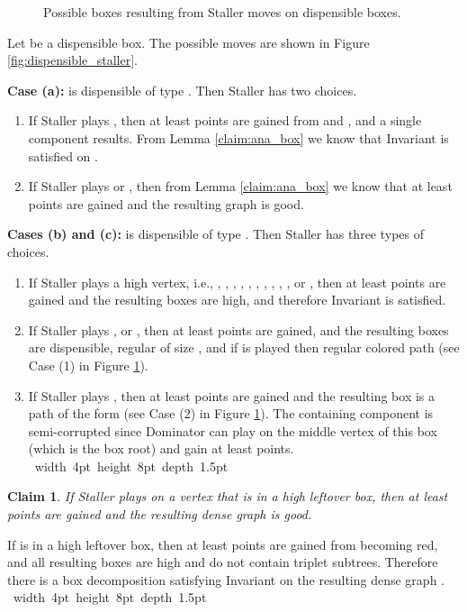 \documentclass[11pt]{article}
\def\Proof{\par\noindent{\bf Proof:~}}
\def\blackslug{\hbox{\hskip 1pt \vrule width 4pt height 8pt
    depth 1.5pt \hskip 1pt}}
\def\QED{\quad\blackslug\lower 8.5pt\null\par}
\def\dnsitem{\vspace{-7pt}\item}
\newtheorem{claim}[theorem]{Claim}
\theoremstyle{definition}
\begin{document}
\begin{figure}[hbtp]
  \caption{\sf Possible boxes resulting from Staller moves on dispensible boxes.}
  \medskip
  \centering
  \label{fig:dispensible_staller_sc}
\end{figure}
\Proof

Let  be a dispensible box.
The possible moves are shown in Figure \ref{fig:dispensible_staller}.

\smallskip
\par\noindent
{\bf Case (a):}
 is dispensible of type .
Then Staller has two choices.
\begin{enumerate}
	\dnsitem If Staller plays , then at least  points are gained from  and , and a single  component results. From Lemma \ref{claim:ana_box} we know that Invariant  is satisfied on . 
	\dnsitem If Staller plays  or , then from Lemma \ref{claim:ana_box} we know that at least  points are gained and the resulting graph  is good.
\end{enumerate}

\smallskip
\par\noindent
{\bf Cases (b) and (c):}
 is dispensible of type .
Then Staller has three types of choices.
\begin{enumerate}
	\dnsitem If Staller plays a high vertex, i.e., , , , , , , , , , ,  or ,
	then at least  points are gained and the resulting boxes are high, and therefore Invariant  is satisfied.
	\dnsitem If Staller plays ,  or , then at least  points are gained, and the resulting boxes are dispensible, regular of size , and if  is played then regular colored path (see Case (1) in Figure \ref{fig:dispensible_staller_sc}).
	\dnsitem If Staller plays , then at least  points are gained and the resulting box is a path of the form  (see Case (2) in Figure \ref{fig:dispensible_staller_sc}). The containing component is semi-corrupted since Dominator can play on the middle  vertex of this box (which is the box root) and gain at least  points. 
\QED
\end{enumerate}

\begin{claim}
\label{claim:staller_clean_leftover}
If Staller plays on  a vertex  that is in a high leftover box, then at least  points are gained and the resulting dense graph  is good.
\end{claim}
\Proof
If  is in a high leftover box, then at least  points are gained from  becoming red, and all resulting boxes are high and do not contain triplet subtrees.
Therefore there is a box decomposition satisfying Invariant  on the resulting dense graph .
\QED
\end{document}
